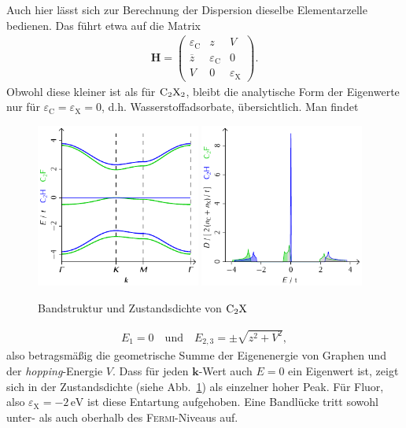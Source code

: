 \documentclass[a4paper, 10pt, twoside, openany]{book} %
\def \vec {\boldsymbol}
\def \eC {\varepsilon_\mathrm{C}}
\def \eX {\varepsilon_\mathrm{X}}
\begin{document}
Auch hier lässt sich zur Berechnung der Dispersion dieselbe Elementarzelle bedienen. Das führt etwa auf die Matrix
%
\begin{align*}
    \vec H =
    \begin{pmatrix}
        \eC         & z   & V \\
        \overline z & \eC & 0 \\
        V           & 0   & \eX
    \end{pmatrix}.
\end{align*}
%
Obwohl diese kleiner ist als für $\rm C_2X_2$, bleibt die analytische Form der Eigenwerte nur für $\eC = \eX = 0$, d.h. Wasserstoffadsorbate, übersichtlich. Man findet
%
\begin{figure}
    \includegraphics[width=0.48\textwidth]{Abbildungen/Bandstrukturen/C2X.pdf}
    \hfill
    \includegraphics[width=0.48\textwidth]{Abbildungen/Bandstrukturen/DOS_C2X.pdf}
    \caption{Bandstruktur und Zustandsdichte von $\rm C_2X$}
    \label{C2X}
\end{figure}
%
\begin{align*}
    E_1 = 0 \quad \text{und} \quad E_{2, 3} = \pm \sqrt{z^2 + V^2},
\end{align*}
%
also betragsmäßig die geometrische Summe der Eigenenergie von Graphen und der \emph{hopping}-Energie $V$. Dass für jeden $\vec k$-Wert auch $E = 0$ ein Eigenwert ist, zeigt sich in der Zustandsdichte (siehe Abb.~\ref{C2X}) als einzelner hoher Peak. Für Fluor, also $\eX = -2\,\mathrm{eV}$ ist diese Entartung aufgehoben. Eine Bandlücke tritt sowohl unter- als auch oberhalb des \textsc{Fermi}-Niveaus auf.
\end{document}
